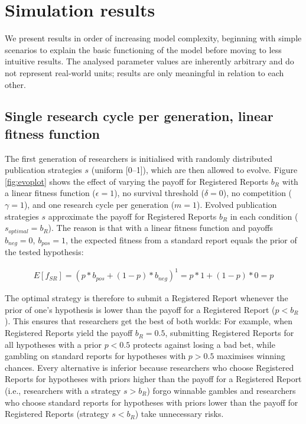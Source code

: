 \documentclass[
  british,
  a4paper,
  ,man,floatsintext]{apa6}
\begin{document}
\section{Simulation results}\label{simulation-results}

We present results in order of increasing model complexity, beginning with simple scenarios to explain the basic functioning of the model before moving to less intuitive results.
The analysed parameter values are inherently arbitrary and do not represent real-world units; results are only meaningful in relation to each other.

\subsection{Single research cycle per generation, linear fitness function}\label{single-research-cycle-per-generation-linear-fitness-function}

The first generation of researchers is initialised with randomly distributed publication strategies \(s\) (uniform {[}0--1{]}), which are then allowed to evolve.
Figure \ref{fig:evoplot} shows the effect of varying the payoff for Registered Reports \(b_{R}\) with a linear fitness function (\(\epsilon = 1\)), no survival threshold (\(\delta = 0\)), no competition (\(\gamma = 1\)), and one research cycle per generation (\(m = 1\)).
Evolved publication strategies \(s\) approximate the payoff for Registered Reports \(b_{R}\) in each condition (\(s_{optimal} = b_{R}\)).
The reason is that with a linear fitness function and payoffs \(b_{neg} = 0\), \(b_{pos} = 1\), the expected fitness from a standard report equals the prior of the tested hypothesis:

\begin{align}
E[f_{SR}] = (p * b_{pos} + (1-p) * b_{neg})^1 = p * 1 +  (1-p) * 0 = p
\end{align}

The optimal strategy is therefore to submit a Registered Report whenever
the prior of one's hypothesis is lower than the payoff for a Registered Report (\(p < b_{R}\)).
This ensures that researchers get the best of both worlds:
For example, when Registered Reports yield the payoff \(b_{R} = 0.5\), submitting Registered Reports for all hypotheses with a prior \(p < 0.5\) protects against losing a bad bet, while gambling on standard reports for hypotheses with \(p > 0.5\) maximises winning chances.
Every alternative is inferior because researchers who choose Registered Reports for hypotheses with priors higher than the payoff for a Registered Report (i.e., researchers with a strategy \(s > b_{R}\)) forgo winnable gambles and researchers who choose standard reports for hypotheses with priors lower than the payoff for Registered Reports (strategy \(s < b_{R}\)) take unnecessary risks.
\end{document}
